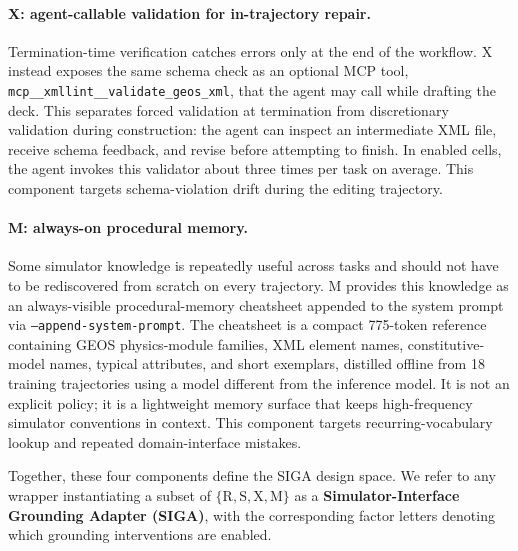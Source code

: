 \documentclass{article}
\begin{document}
\paragraph{X: agent-callable validation for in-trajectory repair.}
Termination-time verification catches errors only at the end of the workflow. 
X instead exposes the same schema check as an optional MCP tool, \texttt{mcp\_\_xmllint\_\_validate\_geos\_xml}, that the agent may call while drafting the deck. 
This separates forced validation at termination from discretionary validation during construction: the agent can inspect an intermediate XML file, receive schema feedback, and revise before attempting to finish. 
In enabled cells, the agent invokes this validator about three times per task on average. 
This component targets schema-violation drift during the editing trajectory.

\paragraph{M: always-on procedural memory.}
Some simulator knowledge is repeatedly useful across tasks and should not have to be rediscovered from scratch on every trajectory. 
M provides this knowledge as an always-visible procedural-memory cheatsheet appended to the system prompt via \texttt{--append-system-prompt}. 
The cheatsheet is a compact 775-token reference containing GEOS physics-module families, XML element names, constitutive-model names, typical attributes, and short exemplars, distilled offline from 18 training trajectories using a model different from the inference model. 
It is not an explicit policy; it is a lightweight memory surface that keeps high-frequency simulator conventions in context. 
This component targets recurring-vocabulary lookup and repeated domain-interface mistakes.

Together, these four components define the SIGA design space. 
We refer to any wrapper instantiating a subset of $\{\mathrm{R,S,X,M}\}$ as a \textbf{Simulator-Interface Grounding Adapter (SIGA)}, with the corresponding factor letters denoting which grounding interventions are enabled.


\end{document}
